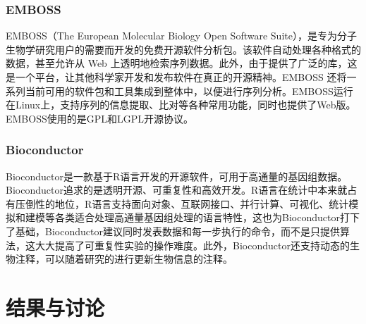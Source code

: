 \documentclass[UTF8]{ctexart}
\begin{document}
\subsubsection{EMBOSS}
EMBOSS（The European Molecular Biology Open Software Suite），是专为分子生物学研究用户的需要而开发的免费开源软件分析包\cite{EMBOSS}。该软件自动处理各种格式的数据，甚至允许从 Web 上透明地检索序列数据。此外，由于提供了广泛的库，这是一个平台，让其他科学家开发和发布软件在真正的开源精神。EMBOSS 还将一系列当前可用的软件包和工具集成到整体中，以便进行序列分析。EMBOSS运行在Linux上，支持序列的信息提取、比对等各种常用功能，同时也提供了Web版。EMBOSS使用的是GPL和LGPL开源协议。
\subsubsection{Bioconductor}
Bioconductor是一款基于R语言开发的开源软件，可用于高通量的基因组数据\cite{Bioconductor}。Bioconductor追求的是透明开源、可重复性和高效开发。R语言在统计中本来就占有压倒性的地位，R语言支持面向对象、互联网接口、并行计算、可视化、统计模拟和建模等各类适合处理高通量基因组处理的语言特性，这也为Bioconductor打下了基础，Bioconductor建议同时发表数据和每一步执行的命令，而不是只提供算法，这大大提高了可重复性实验的操作难度。此外，Bioconductor还支持动态的生物注释，可以随着研究的进行更新生物信息的注释。

\section{结果与讨论}



\end{document}
